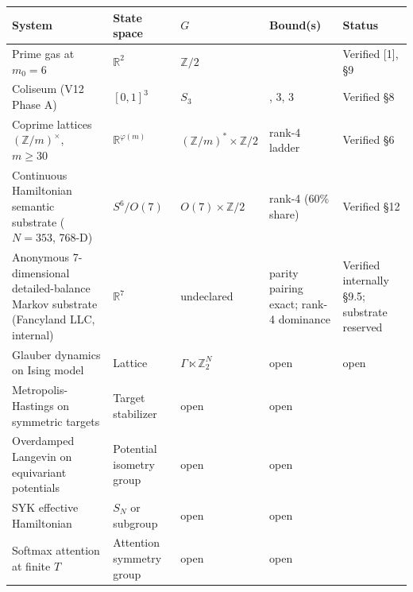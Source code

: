 \documentclass[
  11pt,
]{article}
\newcounter{none} %
\begin{document}
{\def\LTcaptype{none} %
\begin{longtable}[]{@{}
  >{\raggedright\arraybackslash}p{}
  >{\raggedright\arraybackslash}p{}
  >{\raggedright\arraybackslash}p{}
  >{\raggedright\arraybackslash}p{}
  >{\raggedright\arraybackslash}p{}@{}}
\toprule\noalign{}
\begin{minipage}[b]{\linewidth}\raggedright
System
\end{minipage} & \begin{minipage}[b]{\linewidth}\raggedright
State space
\end{minipage} & \begin{minipage}[b]{\linewidth}\raggedright
\(G\)
\end{minipage} & \begin{minipage}[b]{\linewidth}\raggedright
Bound(s)
\end{minipage} & \begin{minipage}[b]{\linewidth}\raggedright
Status
\end{minipage} \\
\midrule\noalign{}
\endhead
\bottomrule\noalign{}
\endlastfoot
Prime gas at \(m_0 = 6\) & \(\mathbb{R}^2\) & \(\mathbb{Z}/2\) & 2 &
Verified {[}1{]}, §9 \\
Coliseum (V12 Phase A) & \([0,1]^3\) & \(S_3\) & 2, 3, 3 & Verified
§8 \\
Coprime lattices \((\mathbb{Z}/m)^\times\), \(m \geq 30\) &
\(\mathbb{R}^{\varphi(m)}\) & \((\mathbb{Z}/m)^* \times \mathbb{Z}/2\) &
rank-4 ladder & Verified §6 \\
Continuous Hamiltonian semantic substrate (\(N = 353\), 768-D) &
\(S^6 / O(7)\) & \(O(7) \times \mathbb{Z}/2\) & rank-4 (60\% share) &
Verified §12 \\
Anonymous 7-dimensional detailed-balance Markov substrate (Fancyland
LLC, internal) & \(\mathbb{R}^7\) & undeclared & parity pairing exact;
rank-4 dominance & Verified internally §9.5; substrate reserved \\
Glauber dynamics on Ising model & Lattice &
\(\Gamma \ltimes \mathbb{Z}_2^N\) & open & open \\
Metropolis-Hastings on symmetric targets & Target stabilizer & open &
open & \\
Overdamped Langevin on equivariant potentials & Potential isometry group
& open & open & \\
SYK effective Hamiltonian & \(S_N\) or subgroup & open & open & \\
Softmax attention at finite \(T\) & Attention symmetry group & open &
open & \\
\end{longtable}
}
\end{document}
